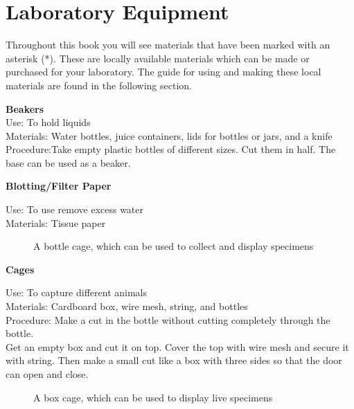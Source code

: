 \chapter{Laboratory Equipment}
Throughout this book you will see materials that have been marked with an asterisk (*). These are locally available materials which can be made or purchased for your laboratory. The guide for using and making these local materials are found in the following section.

\begin{flushleft}
\textbf{Beakers}\\
Use: To hold liquids\\
Materials: Water bottles, juice containers, lids for bottles or jars, and a knife\\
Procedure:Take empty plastic bottles of different sizes. Cut them in half. The base can be used as a beaker.\\
\end{flushleft}

\begin{flushleft}
\textbf{Blotting/Filter Paper}
\end{flushleft}
\vspace{-10pt}
Use: To use remove excess water\\
Materials: Tissue paper \\

\begin{figure}[h]
\begin{center}
\def\svgwidth{2.5cm}

\caption{A bottle cage, which can be used to collect and display specimens}
\label{fig:bottle-cage}
\end{center}
\end{figure}

\begin{flushleft}
\textbf{Cages}
\end{flushleft}
\vspace{-10pt}
Use: To capture different animals\\
Materials: Cardboard box, wire mesh, string, and bottles\\
Procedure: Make a cut in the bottle without cutting completely through the bottle.\\Get an empty box and cut it on top. Cover the top with wire mesh and secure it with string. Then make a small cut like a box with three sides so that the door can open and close.  

\begin{figure}[h]
\begin{center}
\def\svgwidth{6cm}

\caption{A box cage, which can be used to display live specimens}
\label{fig:box-cage}
\end{center}
\end{figure}

